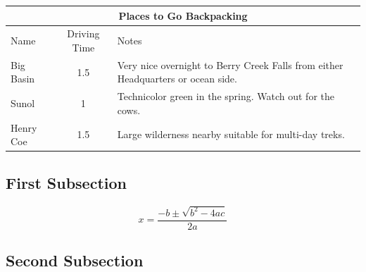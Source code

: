 \lipsum[6]

\begin{tabular}{|l|c|p{3.5in}|}
\hline
\multicolumn{3}{|c|}{Places to Go Backpacking}\\ \hline
Name        &Driving Time   &Notes\\ \hline
Big Basin   &1.5            &Very nice overnight to Berry Creek Falls from either Headquarters or ocean side.\\ \hline
Sunol       &1              &Technicolor green in the spring. Watch out for the cows.\\ \hline
Henry Coe   &1.5            &Large wilderness nearby suitable for multi-day treks.\\ \hline
\end{tabular}

\subsection{First Subsection}
\lipsum[7]

\begin{equation}\label{eqn:example}
x = \frac {-b \pm \sqrt {b^2 - 4ac}}{2a} 
\end{equation}

\subsection{Second Subsection}
\lipsum[8] 